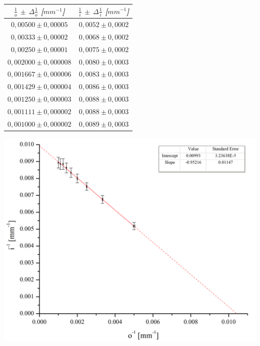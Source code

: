 \documentclass[a4paper,12pt]{article}
\newenvironment{Figure}
  {\par\medskip\noindent\minipage{\linewidth}}
  {\endminipage\par\medskip}
\begin{document}
\begin{multicols*}{2}
\begin{Figure}
            \label{i vs o lc}
        \end{Figure}

        \begin{Figure}
            \centering

            \begin{tabular}{cc}
                \toprule
                \textit{\textbf{$\frac{1}{o}$ $\pm$ $\Delta{\frac{1}{o}}$ [$mm^{-1}$]}} & \textit{\textbf{$\frac{1}{i}$ $\pm$ $\Delta{\frac{1}{i}}$ [$mm^{-1}$]}}\\
                \midrule
                $0,00500 \pm 0,00005$ & $0,0052 \pm 0,0002$ \\ 
                $0,00333 \pm 0,00002$ & $0,0068 \pm 0,0002$ \\ 
                $0,00250 \pm 0,00001$ & $0,0075 \pm 0,0002$ \\ 
                $0,002000 \pm 0,000008$ & $0,0080 \pm 0,0003$ \\ 
                $0,001667 \pm 0,000006$ & $0,0083 \pm 0,0003$ \\ 
                $0,001429 \pm 0,000004$ & $0,0086 \pm 0,0003$ \\ 
                $0,001250 \pm 0,000003$ & $0,0088 \pm 0,0003$ \\ 
                $0,001111 \pm 0,000002$ & $0,0088 \pm 0,0003$ \\ 
                $0,001000 \pm 0,000002$ & $0,0089 \pm 0,0003$ \\
                \bottomrule
            \end{tabular}

            \label{1/i vs 1/o lc}
        \end{Figure}

        \begin{Figure}
            \centering
            \includegraphics[width=0.95\linewidth]{GraficaLC.png}
            \label{grafica lc}
        \end{Figure}


\end{multicols*}
\end{document}
